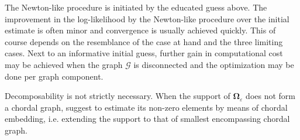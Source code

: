 The Newton-like procedure is initiated by the educated guess above. The improvement in the log-likelihood by the Newton-like procedure over the initial estimate is often minor and convergence is usually achieved quickly. This of course depends on the resemblance of the case at hand and the three limiting cases. Next to an informative initial guess, further gain in computational cost may be achieved when the graph $\mathcal{G}$ is disconnected and the optimization may be done per graph component.

Decomposability is not strictly necessary. When the support of $\mathbf{\Omega}_{\varepsilon}$ does not form a chordal graph, \cite{Dahl2005} suggest to estimate its non-zero elements by means of chordal embedding, i.e. extending the support to that of smallest encompassing chordal graph.




